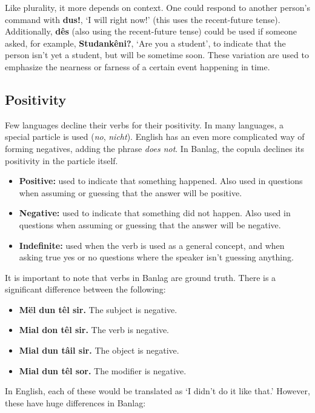 \documentclass[12pt]{report}
\begin{document}
Like plurality, it more depends on context. One could respond to another person's command with \textbf{dus!}, `I will right now!' (this uses the recent-future tense). Additionally, \textbf{d\^es} (also using the recent-future tense) could be used if someone asked, for example, \textbf{Studank\^eni?}, `Are you a student', to indicate that the person isn't yet a student, but will be sometime soon. These variation are used to emphasize the nearness or farness of a certain event happening in time.

\subsection{Positivity}
Few languages decline their verbs for their positivity. In many languages, a special particle is used (\textit{no}, \textit{nicht}). English has an even more complicated way of forming negatives, adding the phrase \textit{does not}. In Banlag, the copula declines its positivity in the particle itself.

\begin{itemize}
\item \textbf{Positive:} used to indicate that something happened. Also used in questions when assuming or guessing that the answer will be positive.
\item \textbf{Negative:} used to indicate that something did not happen. Also used in questions when assuming or guessing that the answer will be negative.
\item \textbf{Indefinite:} used when the verb is used as a general concept, and when asking true yes or no questions where the speaker isn't guessing anything.
\end{itemize}

It is important to note that verbs in Banlag are ground truth. There is a significant difference between the following:

\begin{itemize}
\item \textbf{M\"el dun t\^el sir.} The subject is negative.
\item \textbf{Mial don t\^el sir.} The verb is negative.
\item \textbf{Mial dun t\^ail sir.} The object is negative.
\item \textbf{Mial dun t\^el sor.} The modifier is negative.
\end{itemize}

In English, each of these would be translated as `I didn't do it like that.' However, these have huge differences in Banlag:
\end{document}
